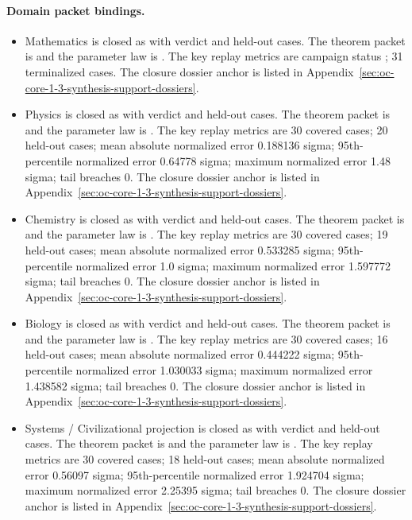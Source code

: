 \paragraph{Domain packet bindings.}
\begin{itemize}[leftmargin=1.6em,nosep]
\item Mathematics is closed as  with verdict  and  held-out cases. The theorem packet is  and the parameter law is . The key replay metrics are campaign status ; 31 terminalized cases. The closure dossier anchor is listed in Appendix~\ref{sec:oc-core-1-3-synthesis-support-dossiers}.
\item Physics is closed as  with verdict  and  held-out cases. The theorem packet is  and the parameter law is . The key replay metrics are 30 covered cases; 20 held-out cases; mean absolute normalized error 0.188136 sigma; 95th-percentile normalized error 0.64778 sigma; maximum normalized error 1.48 sigma; tail breaches 0. The closure dossier anchor is listed in Appendix~\ref{sec:oc-core-1-3-synthesis-support-dossiers}.
\item Chemistry is closed as  with verdict  and  held-out cases. The theorem packet is  and the parameter law is . The key replay metrics are 30 covered cases; 19 held-out cases; mean absolute normalized error 0.533285 sigma; 95th-percentile normalized error 1.0 sigma; maximum normalized error 1.597772 sigma; tail breaches 0. The closure dossier anchor is listed in Appendix~\ref{sec:oc-core-1-3-synthesis-support-dossiers}.
\item Biology is closed as  with verdict  and  held-out cases. The theorem packet is  and the parameter law is . The key replay metrics are 30 covered cases; 16 held-out cases; mean absolute normalized error 0.444222 sigma; 95th-percentile normalized error 1.030033 sigma; maximum normalized error 1.438582 sigma; tail breaches 0. The closure dossier anchor is listed in Appendix~\ref{sec:oc-core-1-3-synthesis-support-dossiers}.
\item Systems / Civilizational projection is closed as  with verdict  and  held-out cases. The theorem packet is  and the parameter law is . The key replay metrics are 30 covered cases; 18 held-out cases; mean absolute normalized error 0.56097 sigma; 95th-percentile normalized error 1.924704 sigma; maximum normalized error 2.25395 sigma; tail breaches 0. The closure dossier anchor is listed in Appendix~\ref{sec:oc-core-1-3-synthesis-support-dossiers}.

\end{itemize}
